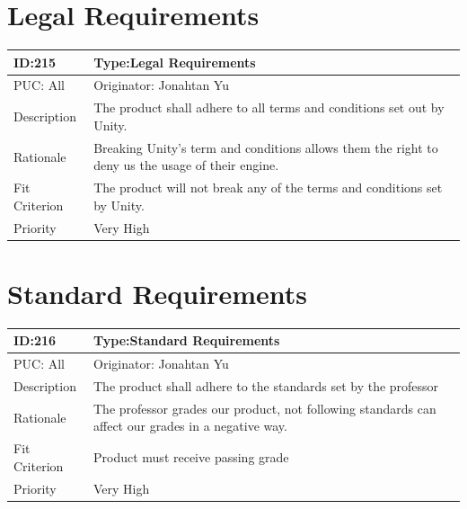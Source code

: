 \documentclass{article}
\begin{document}
	\section{Legal Requirements}
	\begin{table}[H]
		\begin{tabular}{|l|l|l|}
			\hline
			ID:215 & \multicolumn{2}{l|}{Type:Legal Requirements} \\ \hline
			PUC: All & \multicolumn{2}{l|}{Originator: Jonahtan Yu} \\ \hline
			Description & \multicolumn{2}{m{0.85\textwidth}|}{The product shall adhere to all terms and conditions set out by Unity.} \\ \hline
			Rationale & \multicolumn{2}{m{0.85\textwidth}|}{Breaking Unity’s term and conditions allows them the right to deny us the usage of their engine.} \\ \hline
			Fit Criterion & \multicolumn{2}{m{0.85\textwidth}|}{The product will not break any of the terms and conditions set by Unity.} \\ \hline
			Priority& \multicolumn{2}{m{0.85\textwidth}|}{Very High} \\ \hline
		\end{tabular}
	\end{table}

	\section{Standard Requirements}

	\begin{table}[H]
		\begin{tabular}{|l|l|l|}
			\hline
			ID:216 & \multicolumn{2}{l|}{Type:Standard Requirements} \\ \hline
			PUC: All & \multicolumn{2}{l|}{Originator: Jonahtan Yu} \\ \hline
			Description & \multicolumn{2}{m{0.85\textwidth}|}{The product shall adhere to the standards set by the professor} \\ \hline
			Rationale & \multicolumn{2}{m{0.85\textwidth}|}{The professor grades our product, not following standards can affect our grades in a negative way.} \\ \hline
			Fit Criterion & \multicolumn{2}{m{0.85\textwidth}|}{Product must receive passing grade} \\ \hline
			Priority& \multicolumn{2}{m{0.85\textwidth}|}{Very High} \\ \hline
		\end{tabular}
	\end{table}
\end{document}
